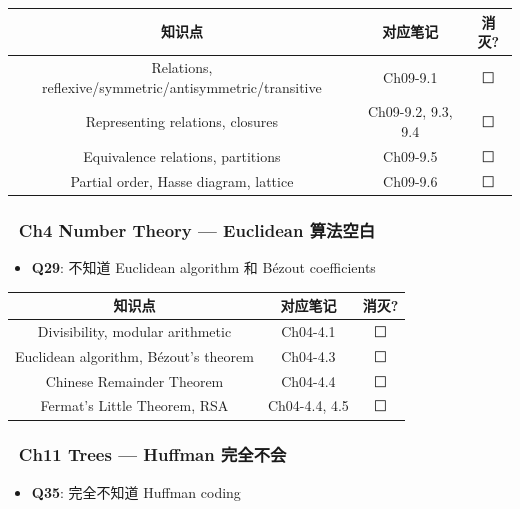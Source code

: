 \documentclass[10pt,a4paper,openany]{ctexbook}
\theoremstyle{definition}
\theoremstyle{remark}
\begin{document}
\begin{center}
\begin{tabular}{ccc}
\hline
知识点 & 对应笔记 & 消灭? \\ \hline
Relations, reflexive/symmetric/antisymmetric/transitive & Ch09-9.1 & ⬜ \\
Representing relations, closures & Ch09-9.2, 9.3, 9.4 & ⬜ \\
Equivalence relations, partitions & Ch09-9.5 & ⬜ \\
Partial order, Hasse diagram, lattice & Ch09-9.6 & ⬜ \\
\hline
\end{tabular}

\end{center}

\subsubsection{🔴 Ch4 Number Theory — Euclidean 算法空白}

\begin{itemize}
\item \textbf{Q29}: 不知道 Euclidean algorithm 和 Bézout coefficients

\end{itemize}

\begin{center}
\begin{tabular}{ccc}
\hline
知识点 & 对应笔记 & 消灭? \\ \hline
Divisibility, modular arithmetic & Ch04-4.1 & ⬜ \\
Euclidean algorithm, Bézout's theorem & Ch04-4.3 & ⬜ \\
Chinese Remainder Theorem & Ch04-4.4 & ⬜ \\
Fermat's Little Theorem, RSA & Ch04-4.4, 4.5 & ⬜ \\
\hline
\end{tabular}

\end{center}

\subsubsection{🔴 Ch11 Trees — Huffman 完全不会}

\begin{itemize}
\item \textbf{Q35}: 完全不知道 Huffman coding

\end{itemize}
\end{document}
